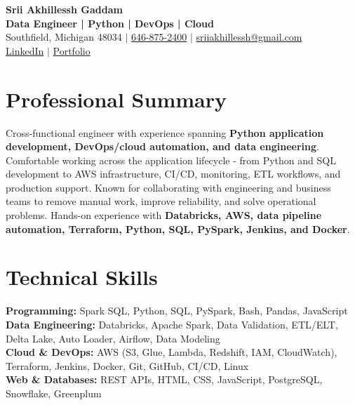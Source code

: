 \documentclass[letterpaper,10pt]{article}
\begin{document}
\fontsize{9.35pt}{10.45pt}\selectfont

\begin{center}
    {\LARGE \textbf{Srii Akhillessh Gaddam}} \\[-1pt]
    \textbf{Data Engineer | Python | DevOps | Cloud} \\[2pt]
    Southfield, Michigan 48034 $|$
    \href{tel:6468752400}{646-875-2400} $|$
    \href{mailto:sriiakhillessh@gmail.com}{sriiakhillessh@gmail.com} \\[1pt]
    \href{https://www.linkedin.com/in/srii-akhiilessh-gaddam-b48668191/}{LinkedIn} $|$
    \href{https://sriiakhillesshg.github.io/portfolio/}{Portfolio}
\end{center}
\vspace{-8pt}

\section{Professional Summary}
\small{Cross-functional engineer with experience spanning \textbf{Python application development, DevOps/cloud automation, and data engineering}. Comfortable working across the application lifecycle - from Python and SQL development to AWS infrastructure, CI/CD, monitoring, ETL workflows, and production support. Known for collaborating with engineering and business teams to remove manual work, improve reliability, and solve operational problems. Hands-on experience with \textbf{Databricks, AWS, data pipeline automation, Terraform, Python, SQL, PySpark, Jenkins, and Docker}.}

\section{Technical Skills}
\small{
\textbf{Programming:} Spark SQL, Python, SQL, PySpark, Bash, Pandas, JavaScript \\
\textbf{Data Engineering:} Databricks, Apache Spark, Data Validation, ETL/ELT, Delta Lake, Auto Loader, Airflow, Data Modeling \\
\textbf{Cloud \& DevOps:} AWS (S3, Glue, Lambda, Redshift, IAM, CloudWatch), Terraform, Jenkins, Docker, Git, GitHub, CI/CD, Linux \\
\textbf{Web \& Databases:} REST APIs, HTML, CSS, JavaScript, PostgreSQL, Snowflake, Greenplum
}

\end{document}
